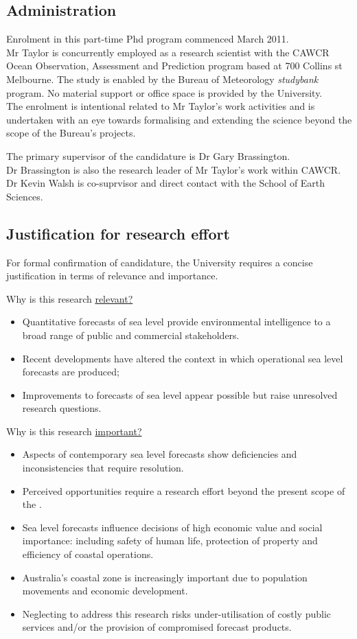\subsection{Administration}
Enrolment in this part-time Phd program commenced March 2011. \\


Mr Taylor is concurrently employed as a research scientist with the CAWCR Ocean Observation, Assessment and Prediction program based at 700 Collins st Melbourne.  The study is enabled by the Bureau of Meteorology \emph{studybank} program. No material support or office space is provided by the University.  \\
The enrolment is intentional related to Mr Taylor's work activities and is undertaken with an eye towards formalising and extending the science beyond the scope of the Bureau's projects.  

\BoxBegin
The primary supervisor of the candidature is Dr Gary Brassington. \\
Dr Brassington is also the research leader of Mr Taylor's work within CAWCR.
Dr Kevin Walsh is co-suprvisor and direct contact with the School of Earth Sciences.
\BoxEnd

\subsection{Justification for research effort}
For formal confirmation of candidature, the University requires a concise justification in terms of relevance and importance.

Why is this research \underline{relevant?}	
\begin{itemize}
\item Quantitative forecasts of sea level provide environmental intelligence to a broad range of public and commercial stakeholders.
\item Recent developments have altered the context in which operational sea level forecasts are produced;
\item Improvements to forecasts of sea level appear possible but raise unresolved research questions. 
\end{itemize}

Why is this research \underline{important?}
\begin{itemize}
\item Aspects of contemporary sea level forecasts show deficiencies and inconsistencies that require resolution.
\item Perceived opportunities require a research effort beyond the present scope of the \BOM.
\item Sea level forecasts influence decisions of high economic value and social importance: including safety of human life, protection of property and efficiency of coastal operations.   
\item Australia's coastal zone is increasingly important due to population movements and economic development.
\item Neglecting to address this research risks under-utilisation of costly public services and/or the provision of compromised forecast products.
\end{itemize}


